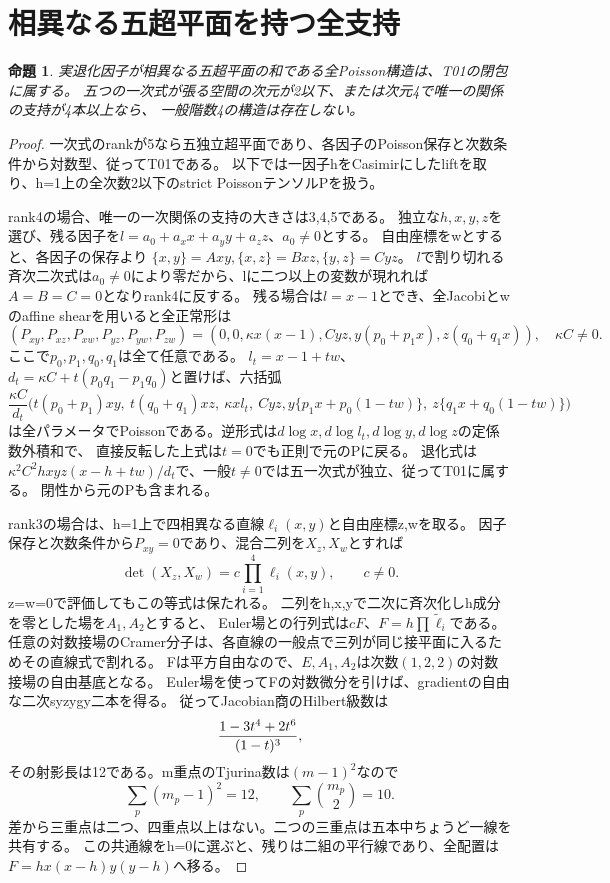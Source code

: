 \documentclass[a4paper,11pt]{ltjsarticle}
\newtheorem{proposition}{命題}[section]
\theoremstyle{definition}
\begin{document}
\section{相異なる五超平面を持つ全支持}
\begin{proposition}\label{prop:five-hyperplanes}
実退化因子が相異なる五超平面の和である全Poisson構造は、T01の閉包に属する。
五つの一次式が張る空間の次元が2以下、または次元4で唯一の関係の支持が4本以上なら、
一般階数4の構造は存在しない。
\end{proposition}
\begin{proof}
一次式のrankが5なら五独立超平面であり、各因子のPoisson保存と次数条件から対数型、従ってT01である。
以下では一因子hをCasimirにしたliftを取り、h=1上の全次数2以下のstrict PoissonテンソルPを扱う。

rank4の場合、唯一の一次関係の支持の大きさは3,4,5である。
独立な$h,x,y,z$を選び、残る因子を$l=a_0+a_xx+a_yy+a_zz$、$a_0\ne0$とする。
自由座標をwとすると、各因子の保存より
$\{x,y\}=Axy,\{x,z\}=Bxz,\{y,z\}=Cyz$。
$l$で割り切れる斉次二次式は$a_0\ne0$により零だから、lに二つ以上の変数が現れれば$A=B=C=0$となりrank4に反する。
残る場合は$l=x-1$とでき、全Jacobiとwのaffine shearを用いると全正常形は
\[
 (P_{xy},P_{xz},P_{xw},P_{yz},P_{yw},P_{zw})
 =(0,0,\kappa x(x-1),Cyz,y(p_0+p_1x),z(q_0+q_1x)),\quad\kappa C\ne0.
\]
ここで$p_0,p_1,q_0,q_1$は全て任意である。
$l_t=x-1+tw$、$d_t=\kappa C+t(p_0q_1-p_1q_0)$と置けば、六括弧
\[
 \frac{\kappa C}{d_t}
 \bigl(t(p_0+p_1)xy,\ t(q_0+q_1)xz,\ \kappa xl_t,\ Cyz,
 y\{p_1x+p_0(1-tw)\},\ z\{q_1x+q_0(1-tw)\}\bigr)
\]
は全パラメータでPoissonである。逆形式は$d\log x,d\log l_t,d\log y,d\log z$の定係数外積和で、
直接反転した上式は$t=0$でも正則で元のPに戻る。
退化式は$\kappa^2C^2hxyz(x-h+tw)/d_t$で、一般$t\ne0$では五一次式が独立、従ってT01に属する。
閉性から元のPも含まれる。

rank3の場合は、h=1上で四相異なる直線$\ell_i(x,y)$と自由座標z,wを取る。
因子保存と次数条件から$P_{xy}=0$であり、混合二列を$X_z,X_w$とすれば
\[
 \det(X_z,X_w)=c\prod_{i=1}^4\ell_i(x,y),\qquad c\ne0.
\]
z=w=0で評価してもこの等式は保たれる。
二列をh,x,yで二次に斉次化しh成分を零とした場を$A_1,A_2$とすると、
Euler場との行列式は$cF$、$F=h\prod\widetilde\ell_i$である。
任意の対数接場のCramer分子は、各直線の一般点で三列が同じ接平面に入るためその直線式で割れる。
Fは平方自由なので、$E,A_1,A_2$は次数$(1,2,2)$の対数接場の自由基底となる。
Euler場を使ってFの対数微分を引けば、gradientの自由な二次syzygy二本を得る。
従ってJacobian商のHilbert級数は
\[
 {1-3t^4+2t^6\over(1-t)^3},
\]
その射影長は12である。m重点のTjurina数は$(m-1)^2$なので
\[
 \sum_p(m_p-1)^2=12,\qquad\sum_p\binom{m_p}{2}=10.
\]
差から三重点は二つ、四重点以上はない。二つの三重点は五本中ちょうど一線を共有する。
この共通線をh=0に選ぶと、残りは二組の平行線であり、全配置は
$F=hx(x-h)y(y-h)$へ移る。


\end{proof}
\end{document}
